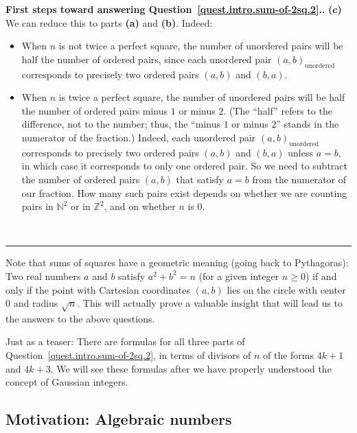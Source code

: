 \documentclass[numbers=enddot,12pt,final,onecolumn,notitlepage]{scrartcl}%
\numberwithin{exer}{section}
\theoremstyle{definition}
\newenvironment{proof}[1][Proof]{\noindent\textbf{#1.} }{\ \rule{0.5em}{0.5em}}
\newcommand{\NN}{\mathbb{N}} %
\newcommand{\ZZ}{\mathbb{Z}} %
\newcommand{\tup}[1]{\left( #1 \right)}
\begin{document}
\begin{proof}[First steps toward answering Question~\ref{quest.intro.sum-of-2sq.2}.]
\textbf{(c)} We can reduce this to parts \textbf{(a)} and
\textbf{(b)}. Indeed:
\begin{itemize}
\item When $n$ is not twice a perfect square, the
number of unordered pairs will be half the number of ordered
pairs, since each unordered pair $\tup{a, b}_{\text{unordered}}$
corresponds to precisely two ordered pairs $\tup{a, b}$
and $\tup{b, a}$.
\item When $n$ is twice a perfect square, the
number of unordered pairs will be half the number of ordered
pairs minus $1$ or minus $2$. (The ``half'' refers to the
difference, not to the number; thus, the ``minus $1$ or minus $2$''
stands in the numerator of the fraction.)
Indeed,
each unordered pair $\tup{a, b}_{\text{unordered}}$
corresponds to precisely two ordered pairs $\tup{a, b}$
and $\tup{b, a}$ unless $a = b$, in which case it corresponds
to only one ordered pair.
So we need to subtract the number of ordered pairs $\tup{a, b}$
that satisfy $a = b$ from the numerator of our fraction.
How many such pairs exist depends on whether we are counting
pairs in $\NN^2$ or in $\ZZ^2$, and on whether $n$ is $0$.
\qedhere
\end{itemize}
\end{proof}

Note that sums of squares have a geometric meaning (going back
to Pythagoras):
Two real numbers $a$ and $b$ satisfy $a^2 + b^2 = n$ (for a given
integer $n \geq 0$) if and only if the point with Cartesian
coordinates $\tup{a, b}$ lies on the circle with center $0$ and
radius $\sqrt{n}$.
This will actually prove a valuable insight that will lead us
to the answers to the above questions.

Just as a teaser: There are formulas for all three parts of
Question~\ref{quest.intro.sum-of-2sq.2}, in terms of divisors
of $n$ of the forms $4k+1$ and $4k+3$.
We will see these formulas after we have properly understood
the concept of Gaussian integers.

\subsection{\label{subsect.intro.algnum}Motivation: Algebraic numbers}
\end{document}
